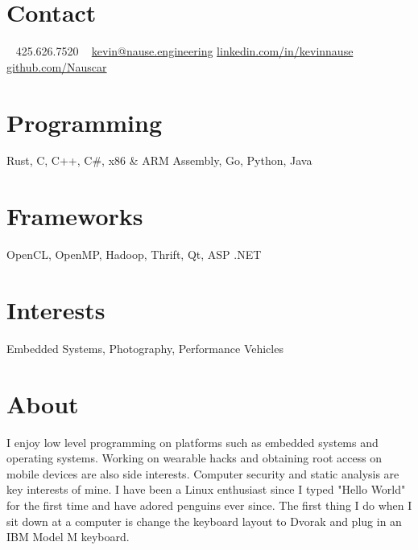 \documentclass[print]{friggeri-cv} %
\begin{document}


\begin{aside} %
\section{Contact}
~
425.626.7520
~
{\scriptsize \href{mailto:kevin@nause.engineering}{kevin@nause.engineering}}
{\scriptsize \href{https://linkedin.com/in/kevinnause}{linkedin.com/in/kevinnause}}
{\scriptsize \href{https://github.com/Nauscar}{github.com/Nauscar}}
\section{Programming}
Rust, C, C++, C\#,
x86 \& ARM Assembly, 
Go, Python, Java
\section{Frameworks}
OpenCL, OpenMP,
Hadoop, Thrift, 
Qt, ASP .NET
\section{Interests}
{Embedded Systems, Photography, Performance Vehicles}
\section{About}
{I enjoy low level programming on platforms such as embedded systems and operating systems.
Working on wearable hacks and obtaining root access on mobile devices are also side interests. 
Computer security and static analysis are key interests of mine. 
I have been a Linux enthusiast since I typed "Hello World" for the first time and have adored penguins ever since. 
The first thing I do when I sit down at a computer is change the keyboard layout to Dvorak and plug in an IBM Model M keyboard.}
\end{aside}

\end{document}
